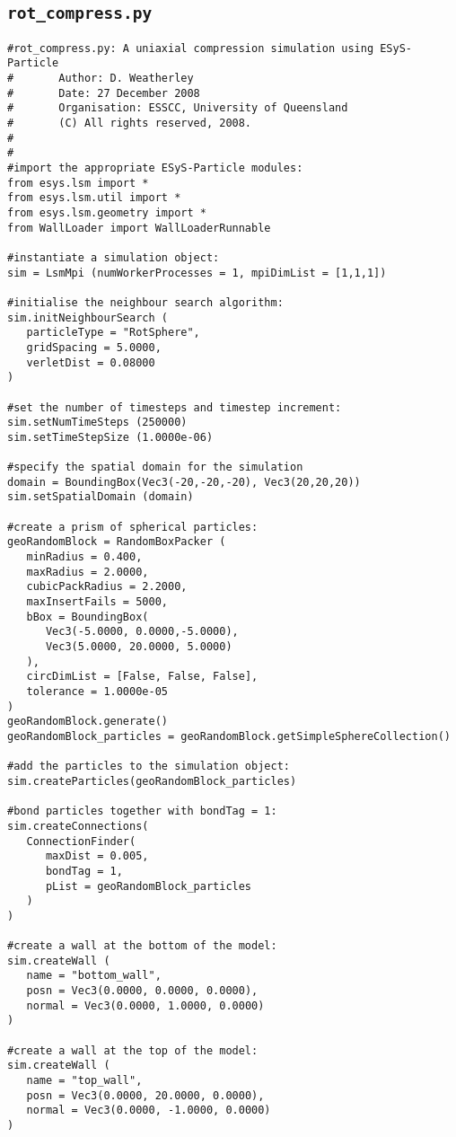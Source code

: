 \subsection{\texttt{rot\_compress.py}}\label{code:rot_compress}
\begin{verbatim}
#rot_compress.py: A uniaxial compression simulation using ESyS-Particle
#       Author: D. Weatherley
#       Date: 27 December 2008
#       Organisation: ESSCC, University of Queensland
#       (C) All rights reserved, 2008.
#
#
#import the appropriate ESyS-Particle modules:
from esys.lsm import *
from esys.lsm.util import *
from esys.lsm.geometry import *
from WallLoader import WallLoaderRunnable

#instantiate a simulation object: 
sim = LsmMpi (numWorkerProcesses = 1, mpiDimList = [1,1,1])

#initialise the neighbour search algorithm:
sim.initNeighbourSearch (
   particleType = "RotSphere",
   gridSpacing = 5.0000,
   verletDist = 0.08000
)

#set the number of timesteps and timestep increment:
sim.setNumTimeSteps (250000)
sim.setTimeStepSize (1.0000e-06) 

#specify the spatial domain for the simulation
domain = BoundingBox(Vec3(-20,-20,-20), Vec3(20,20,20))
sim.setSpatialDomain (domain)

#create a prism of spherical particles:
geoRandomBlock = RandomBoxPacker (
   minRadius = 0.400,
   maxRadius = 2.0000,
   cubicPackRadius = 2.2000,
   maxInsertFails = 5000,
   bBox = BoundingBox(
      Vec3(-5.0000, 0.0000,-5.0000),
      Vec3(5.0000, 20.0000, 5.0000)
   ),
   circDimList = [False, False, False],
   tolerance = 1.0000e-05
)
geoRandomBlock.generate()
geoRandomBlock_particles = geoRandomBlock.getSimpleSphereCollection()

#add the particles to the simulation object:
sim.createParticles(geoRandomBlock_particles)

#bond particles together with bondTag = 1:
sim.createConnections(
   ConnectionFinder(
      maxDist = 0.005,
      bondTag = 1,
      pList = geoRandomBlock_particles
   )
)

#create a wall at the bottom of the model:
sim.createWall (
   name = "bottom_wall",
   posn = Vec3(0.0000, 0.0000, 0.0000),
   normal = Vec3(0.0000, 1.0000, 0.0000)
)

#create a wall at the top of the model:
sim.createWall (
   name = "top_wall",
   posn = Vec3(0.0000, 20.0000, 0.0000),
   normal = Vec3(0.0000, -1.0000, 0.0000)
)


\end{verbatim}
